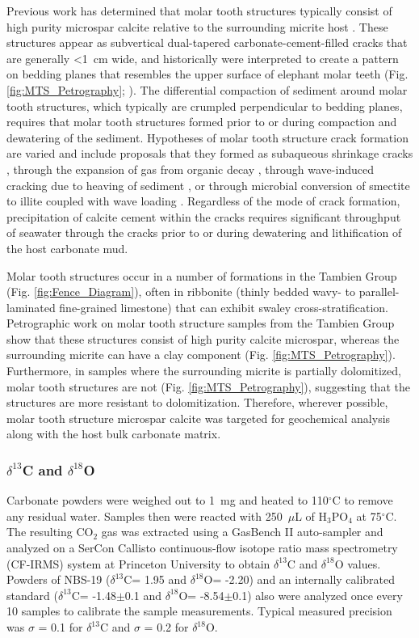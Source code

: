 \documentclass[11pt,letterpaper]{article}
\newcommand{\degC}{$^{\circ}$C\xspace}
\newcommand{\dC}{$\delta^{13}$C\xspace}
\newcommand{\dO}{$\delta^{18}$O\xspace}
\newcommand{\permil}{\textperthousand\xspace}
\begin{document}
Previous work has determined that molar tooth structures typically consist of high purity microspar calcite relative to the surrounding micrite host \citep{Smith1968a, Fairchild1997a, Pratt1998a}. These structures appear as subvertical dual-tapered carbonate-cement-filled cracks that are generally \textless1~cm wide, and historically were interpreted to create a pattern on bedding planes that resembles the upper surface of elephant molar teeth (Fig. \ref{fig:MTS_Petrography}; \citealp{Bauerman1884a, Daly1912a}). The differential compaction of sediment around molar tooth structures, which typically are crumpled perpendicular to bedding planes, requires that molar tooth structures formed prior to or during compaction and dewatering of the sediment. Hypotheses of molar tooth structure crack formation are varied and include proposals that they formed as subaqueous shrinkage cracks \citep{Smith1968a}, through the expansion of gas from organic decay \citep{Pollock2006a}, through wave-induced cracking due to heaving of sediment \citep{Bishop2006a}, or through microbial conversion of smectite to illite coupled with wave loading \citep{Hodgskiss2018a}. Regardless of the mode of crack formation, precipitation of calcite cement within the cracks requires significant throughput of seawater through the cracks prior to or during dewatering and lithification of the host carbonate mud.

Molar tooth structures occur in a number of formations in the Tambien Group (Fig. \ref{fig:Fence_Diagram}), often in ribbonite (thinly bedded wavy- to parallel-laminated fine-grained limestone) that can exhibit swaley cross-stratification. Petrographic work on molar tooth structure samples from the Tambien Group show that these structures consist of high purity calcite microspar, whereas the surrounding micrite can have a clay component (Fig. \ref{fig:MTS_Petrography}). Furthermore, in samples where the surrounding micrite is partially dolomitized, molar tooth structures are not (Fig. \ref{fig:MTS_Petrography}), suggesting that the structures are more resistant to dolomitization. Therefore, wherever possible, molar tooth structure microspar calcite was targeted for geochemical analysis along with the host bulk carbonate matrix.

\subsubsection*{\dC and \dO \label{sec:dCanddO}}

Carbonate powders were weighed out to 1~mg and heated to 110\degC to remove any residual water. Samples then were reacted with 250~$\mu$L of H$_{3}$PO$_{4}$ at 75\degC. The resulting CO$_{2}$ gas was extracted using a GasBench II auto-sampler and analyzed on a SerCon Callisto continuous-flow isotope ratio mass spectrometry (CF-IRMS) system at Princeton University to obtain \dC and \dO values. Powders of NBS-19 (\dC = 1.95\permil and \dO = -2.20\permil) and an internally calibrated standard (\dC = -1.48$\pm$0.1\permil and \dO = -8.54$\pm$0.1\permil) also were analyzed once every 10 samples to calibrate the sample measurements. Typical measured precision was $\sigma$ = 0.1\permil for \dC and $\sigma$ = 0.2\permil for \dO.
\end{document}
